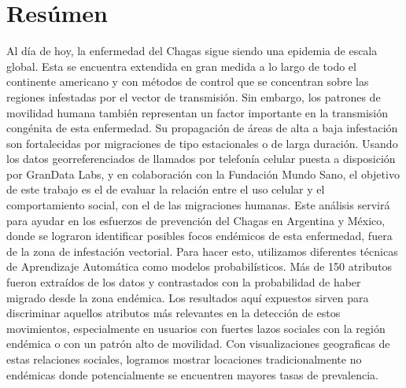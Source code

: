 \chapter{Res\'umen}
\label{cha:resumen}

Al día de hoy, la enfermedad del Chagas sigue siendo una epidemia de escala global. Esta se encuentra extendida en gran medida a lo largo de todo el continente americano y con métodos de control que se concentran sobre las regiones infestadas por el vector de transmisión. Sin embargo, los patrones de movilidad humana también representan un factor importante en la transmisión congénita de esta enfermedad. Su propagación de áreas de alta a baja infestación son fortalecidas por migraciones de tipo estacionales o de larga duración. Usando los datos georreferenciados de llamados por telefonía celular puesta a disposición por GranData Labs, y en colaboración con la Fundación Mundo Sano, el objetivo de este trabajo es el de evaluar la relación entre el uso celular y el comportamiento social, con el de las migraciones humanas. Este análisis servirá para ayudar en los esfuerzos de prevención del Chagas en Argentina y México, donde se lograron identificar posibles focos endémicos de esta enfermedad, fuera de la zona de infestación vectorial. Para hacer esto, utilizamos diferentes técnicas de Aprendizaje Automática como modelos probabilísticos. Más de 150 atributos fueron extraídos de los datos y contrastados con la probabilidad de haber migrado desde la zona endémica. Los resultados aquí expuestos sirven para discriminar aquellos atributos más relevantes en la detección de estos movimientos, especialmente en usuarios con fuertes lazos sociales con la región endémica o con un patrón alto de movilidad. Con visualizaciones geograficas de estas relaciones sociales, logramos mostrar locaciones tradicionalmente no endémicas donde potencialmente se encuentren mayores tasas de prevalencia.
